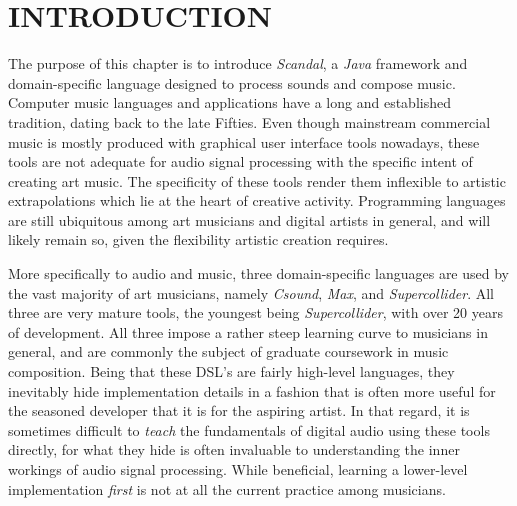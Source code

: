 \chapter{INTRODUCTION}

The purpose of this chapter is to introduce \emph{Scandal}, a \emph{Java} framework and domain-specific language designed to process sounds and compose music. Computer music languages and applications have a long and established tradition, dating back to the late Fifties. Even though mainstream commercial music is mostly produced with graphical user interface tools nowadays, these tools are not adequate for audio signal processing with the specific intent of creating art music. The specificity of these tools render them inflexible to artistic extrapolations which lie at the heart of creative activity. Programming languages are still ubiquitous among art musicians and digital artists in general, and will likely remain so, given the flexibility artistic creation requires.

More specifically to audio and music, three domain-specific languages are used by the vast majority of art musicians, namely \emph{Csound}, \emph{Max}, and \emph{Supercollider}. All three are very mature tools, the youngest being \emph{Supercollider}, with over 20 years of development. All three impose a rather steep learning curve to musicians in general, and are commonly the subject of graduate coursework in music composition. Being that these DSL's are fairly high-level languages, they inevitably hide implementation details in a fashion that is often more useful for the seasoned developer that it is for the aspiring artist. In that regard, it is sometimes difficult to \emph{teach} the fundamentals of digital audio using these tools directly, for what they hide is often invaluable to understanding the inner workings of audio signal processing. While beneficial, learning a lower-level implementation \emph{first} is not at all the current practice among musicians.

